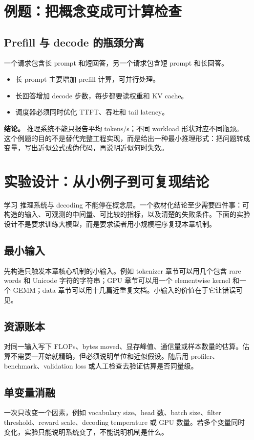 \documentclass[a4paper]{article}
\begin{document}
\section{例题：把概念变成可计算检查}
\subsection{Prefill 与 decode 的瓶颈分离}
一个请求包含长 prompt 和短回答，另一个请求包含短 prompt 和长回答。
\begin{itemize}
\item 长 prompt 主要增加 prefill 计算，可并行处理。
\item 长回答增加 decode 步数，每步都要读权重和 KV cache。
\item 调度器必须同时优化 TTFT、吞吐和 tail latency。
\end{itemize}
\textbf{结论。} 推理系统不能只报告平均 tokens/s；不同 workload 形状对应不同瓶颈。
这个例题的目的不是替代完整工程实现，而是给出一种最小推理形式：把问题转成变量，写出近似公式或伪代码，再说明近似何时失效。
\section{实验设计：从小例子到可复现结论}
学习 推理系统与 decoding 不能停在概念层。一个教材化结论至少需要四件事：可构造的输入、可观测的中间量、可比较的指标，以及清楚的失败条件。下面的实验设计不是要求训练大模型，而是要求读者用小规模程序复现本章机制。
\subsection{最小输入}
先构造只触发本章核心机制的小输入。例如 tokenizer 章节可以用几个包含 rare words 和 Unicode 字符的字符串；GPU 章节可以用一个 elementwise kernel 和一个 GEMM；data 章节可以用十几篇近重复文档。小输入的价值在于它让错误可见。
\subsection{资源账本}
对同一输入写下 FLOPs、bytes moved、显存峰值、通信量或样本数量的估算。估算不需要一开始就精确，但必须说明单位和近似假设。随后用 profiler、benchmark、validation loss 或人工检查去验证估算是否同量级。
\subsection{单变量消融}
一次只改变一个因素，例如 vocabulary size、head 数、batch size、filter threshold、reward scale、decoding temperature 或 GPU 数量。若多个变量同时变化，实验只能说明系统变了，不能说明机制是什么。
\end{document}
